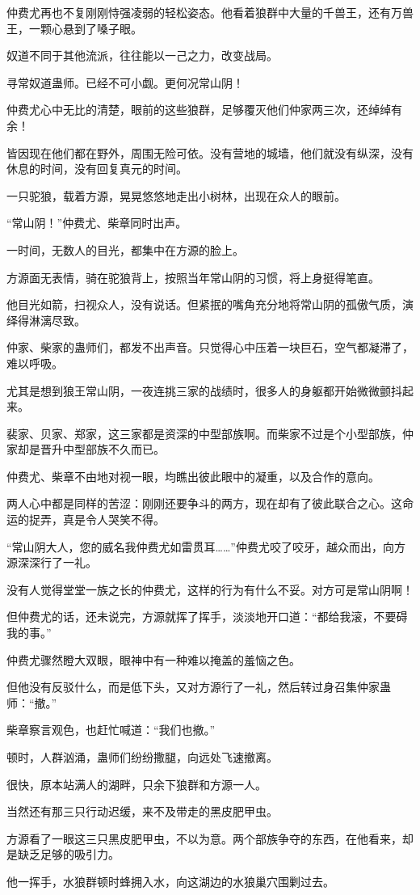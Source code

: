 \begin{this_body}
仲费尤再也不复刚刚恃强凌弱的轻松姿态。他看着狼群中大量的千兽王，还有万兽王，一颗心悬到了嗓子眼。

奴道不同于其他流派，往往能以一己之力，改变战局。

寻常奴道蛊师。已经不可小觑。更何况常山阴！

仲费尤心中无比的清楚，眼前的这些狼群，足够覆灭他们仲家两三次，还绰绰有余！

皆因现在他们都在野外，周围无险可依。没有营地的城墙，他们就没有纵深，没有休息的时间，没有回复真元的时间。

一只驼狼，载着方源，晃晃悠悠地走出小树林，出现在众人的眼前。

“常山阴！”仲费尤、柴章同时出声。

一时间，无数人的目光，都集中在方源的脸上。

方源面无表情，骑在驼狼背上，按照当年常山阴的习惯，将上身挺得笔直。

他目光如箭，扫视众人，没有说话。但紧抿的嘴角充分地将常山阴的孤傲气质，演绎得淋漓尽致。

仲家、柴家的蛊师们，都发不出声音。只觉得心中压着一块巨石，空气都凝滞了，难以呼吸。

尤其是想到狼王常山阴，一夜连挑三家的战绩时，很多人的身躯都开始微微颤抖起来。

裴家、贝家、郑家，这三家都是资深的中型部族啊。而柴家不过是个小型部族，仲家却是晋升中型部族不久而已。

仲费尤、柴章不由地对视一眼，均瞧出彼此眼中的凝重，以及合作的意向。

两人心中都是同样的苦涩：刚刚还要争斗的两方，现在却有了彼此联合之心。这命运的捉弄，真是令人哭笑不得。

“常山阴大人，您的威名我仲费尤如雷贯耳……”仲费尤咬了咬牙，越众而出，向方源深深行了一礼。

没有人觉得堂堂一族之长的仲费尤，这样的行为有什么不妥。对方可是常山阴啊！

但仲费尤的话，还未说完，方源就挥了挥手，淡淡地开口道：“都给我滚，不要碍我的事。”

仲费尤骤然瞪大双眼，眼神中有一种难以掩盖的羞恼之色。

但他没有反驳什么，而是低下头，又对方源行了一礼，然后转过身召集仲家蛊师：“撤。”

柴章察言观色，也赶忙喊道：“我们也撤。”

顿时，人群汹涌，蛊师们纷纷撒腿，向远处飞速撤离。

很快，原本站满人的湖畔，只余下狼群和方源一人。

当然还有那三只行动迟缓，来不及带走的黑皮肥甲虫。

方源看了一眼这三只黑皮肥甲虫，不以为意。两个部族争夺的东西，在他看来，却是缺乏足够的吸引力。

他一挥手，水狼群顿时蜂拥入水，向这湖边的水狼巢穴围剿过去。

\end{this_body}

